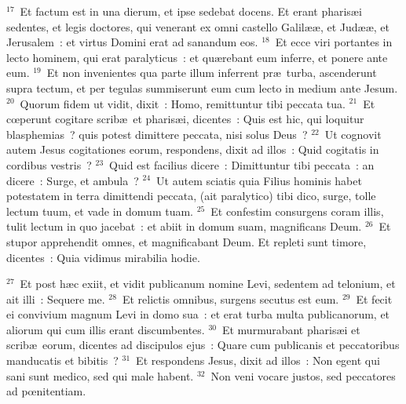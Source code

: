 ${}^{17}$~Et factum est in una dierum, et ipse sedebat docens. Et erant pharis\ae i sedentes, et legis doctores, qui venerant ex omni castello Galil\ae \ae , et Jud\ae \ae , et Jerusalem~: et virtus Domini erat ad sanandum eos.
${}^{18}$~Et ecce viri portantes in lecto hominem, qui erat paralyticus~: et qu\ae rebant eum inferre, et ponere ante eum.
${}^{19}$~Et non invenientes qua parte illum inferrent pr\ae\ turba, ascenderunt supra tectum, et per tegulas summiserunt eum cum lecto in medium ante Jesum.
${}^{20}$~Quorum fidem ut vidit, dixit~: Homo, remittuntur tibi peccata tua.
${}^{21}$~Et cœperunt cogitare scrib\ae\ et pharis\ae i, dicentes~: Quis est hic, qui loquitur blasphemias~? quis potest dimittere peccata, nisi solus Deus~?
${}^{22}$~Ut cognovit autem Jesus cogitationes eorum, respondens, dixit ad illos~: Quid cogitatis in cordibus vestris~?
${}^{23}$~Quid est facilius dicere~: Dimittuntur tibi peccata~: an dicere~: Surge, et ambula~?
${}^{24}$~Ut autem sciatis quia Filius hominis habet potestatem in terra dimittendi peccata, (ait paralytico) tibi dico, surge, tolle lectum tuum, et vade in domum tuam.
${}^{25}$~Et confestim consurgens coram illis, tulit lectum in quo jacebat~: et abiit in domum suam, magnificans Deum.
${}^{26}$~Et stupor apprehendit omnes, et magnificabant Deum. Et repleti sunt timore, dicentes~: Quia vidimus mirabilia hodie.


${}^{27}$~Et post h\ae c exiit, et vidit publicanum nomine Levi, sedentem ad telonium, et ait illi~: Sequere me.
${}^{28}$~Et relictis omnibus, surgens secutus est eum.
${}^{29}$~Et fecit ei convivium magnum Levi in domo sua~: et erat turba multa publicanorum, et aliorum qui cum illis erant discumbentes.
${}^{30}$~Et murmurabant pharis\ae i et scrib\ae\ eorum, dicentes ad discipulos ejus~: Quare cum publicanis et peccatoribus manducatis et bibitis~?
${}^{31}$~Et respondens Jesus, dixit ad illos~: Non egent qui sani sunt medico, sed qui male habent.
${}^{32}$~Non veni vocare justos, sed peccatores ad pœnitentiam.


